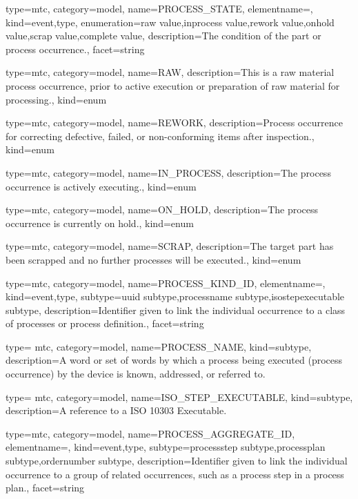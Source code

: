 {
  type=mtc,
  category=model,
  name={PROCESS\_STATE},
  elementname=,
  kind={event,type},
  enumeration={\gls{raw value},\gls{inprocess value},\gls{rework value},\gls{onhold value},\gls{scrap value},\gls{complete value}},
  description={The condition of the part or process occurrence.},
  facet={\gls{string}}
}

{
  type=mtc,
  category=model,
  name={RAW},
  description={This is a raw material process occurrence, prior to active execution or preparation of raw material for processing.},
  kind={enum}
}

{
  type=mtc,
  category=model,
  name={REWORK},
  description={Process occurrence for correcting defective, failed, or non-conforming items after inspection.},
  kind={enum}
}

{
  type=mtc,
  category=model,
  name={IN\_PROCESS},
  description={The process occurrence is actively executing.},
  kind={enum}
}

{
  type=mtc,
  category=model,
  name={ON\_HOLD},
  description={The process occurrence is currently on hold.},
  kind={enum}
}

{
  type=mtc,
  category=model,
  name={SCRAP},
  description={The target part has been scrapped and no further processes will be executed.},
  kind={enum}
}

{
  type=mtc,
  category=model,
  name={PROCESS\_KIND\_ID},
  elementname=,
  kind={event,type},
  subtype={\gls{uuid subtype},\gls{processname subtype},\gls{isostepexecutable subtype}},
  description={Identifier given to link the individual occurrence to a class of processes or process definition.},
  facet={\gls{string}}
}

{
  type= mtc,
  category=model,
  name={PROCESS\_NAME},
  kind={subtype},
  description={A word or set of words by which a process being executed (process occurrence) by the device is known, addressed, or referred to.}
}

{
  type= mtc,
  category=model,
  name={ISO\_STEP\_EXECUTABLE},
  kind={subtype},
  description={A reference to a ISO 10303 Executable.}
}

{
  type=mtc,
  category=model,
  name={PROCESS\_AGGREGATE\_ID},
  elementname=,
  kind={event,type},
  subtype={\gls{processstep subtype},\gls{processplan subtype},\gls{ordernumber subtype}},
  description={Identifier given to link the individual occurrence to a group of related occurrences, such as a process step in a process plan.},
  facet={\gls{string}}
}

